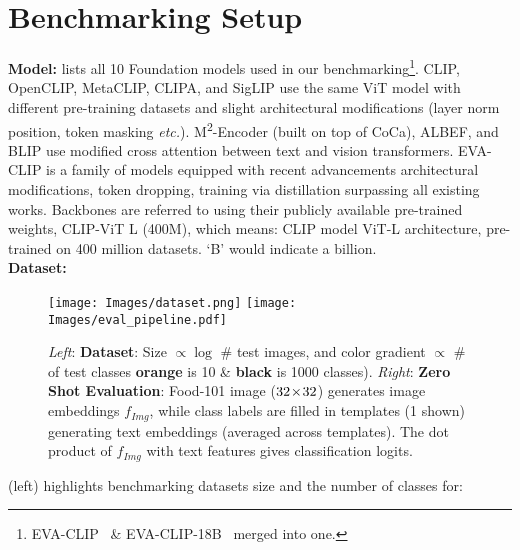 \section{Benchmarking Setup}
\vspace{-2pt}
\noindent \textbf{Model:}
 lists all 10 Foundation models used in our benchmarking\footnote{ 
EVA-CLIP~\citep{sun2023eva} \& EVA-CLIP-18B~\citep{EVA-CLIP-18B} merged into one.}.
CLIP, OpenCLIP, MetaCLIP, CLIPA, and SigLIP use the same ViT model with different pre-training datasets and slight architectural modifications (\eg layer norm position, token masking \textit{etc.}).
M\textsuperscript{2}-Encoder (built on top of CoCa), ALBEF, and BLIP use modified cross attention between text and vision transformers.  
EVA-CLIP is a family of models equipped with recent advancements \eg architectural modifications, token dropping, training via distillation \etc surpassing all existing works. 
Backbones are referred to using their publicly available pre-trained weights, \eg CLIP-ViT L (400M), which means: CLIP model ViT-L architecture, pre-trained on 400 million datasets. `B' would indicate a billion. \vspace{4pt}\\  
\noindent \textbf{Dataset:}
\begin{figure}[!tb]
\centering
\subfloat
{
\texttt{[image: Images/dataset.png]}
}
\hfill 
\subfloat
{
\texttt{[image: Images/eval\_pipeline.pdf]}
}
\vspace{-2pt}
\caption{ 
\emph{Left}: \textbf{Dataset}: Size $\propto\log$ \# test images, and color gradient $\propto$ \# of test classes 
{\color{orange}\textbf{orange}} is 10 \& {\color{black}\textbf{black}} is 1000 classes). 
\emph{Right}: \textbf{Zero Shot Evaluation}: 
Food-101 image ($32\!\times\!32$) generates image embeddings $f_{Img}$, while class labels are filled in templates (1 shown) generating text embeddings (averaged across templates).
The dot product of $f_{Img}$ with text features gives classification logits.
}
\vspace{-7pt}
\label{fig:eval_pipeline}
\label{fig:dataset}
\label{fig:dataset_eval_pipeline}
\end{figure}
 (left) highlights benchmarking datasets size and the number of classes for: 
